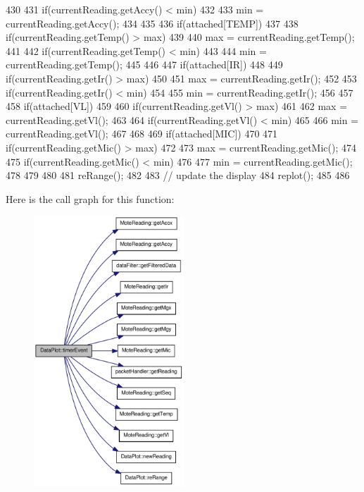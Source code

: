 \begin{DoxyCode}
{{{{430                 }
431                 if(currentReading.getAccy() < min)
432                 {
433                     min = currentReading.getAccy();
434                 }
435             }
436             if(attached[TEMP])
437             {
438                 if(currentReading.getTemp() > max)
439                 {
440                     max = currentReading.getTemp();
441                 }
442                 if(currentReading.getTemp() < min)
443                 {
444                     min = currentReading.getTemp();
445                 }
446             }
447             if(attached[IR])
448             {
449                 if(currentReading.getIr() > max)
450                 {
451                     max = currentReading.getIr();
452                 }
453                 if(currentReading.getIr() < min)
454                 {
455                     min = currentReading.getIr();
456                 }
457             }
458             if(attached[VL])
459             {
460                 if(currentReading.getVl() > max)
461                 {
462                     max = currentReading.getVl();
463                 }
464                 if(currentReading.getVl() < min)
465                 {
466                     min = currentReading.getVl();
467                 }
468             }
469             if(attached[MIC])
470             {
471                 if(currentReading.getMic() > max)
472                 {
473                     max = currentReading.getMic();
474                 }
475                 if(currentReading.getMic() < min)
476                 {
477                     min = currentReading.getMic();
478                 }
479             }
480 
481             reRange();
482         }
483        // update the display
484     replot();
485 
486     }
\end{DoxyCode}




Here is the call graph for this function:\nopagebreak
\begin{figure}[H]
\begin{center}
\leavevmode
\includegraphics[width=160pt]{classDataPlot_a41c9c4bc12d8d3e3abdf893c4fcfad7b_cgraph}
\end{center}
\end{figure}




